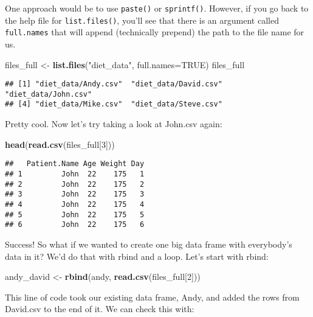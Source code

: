 \documentclass[
]{article}
\newenvironment{Shaded}{\begin{snugshade}}{\end{snugshade}}
\newcommand{\DataTypeTok}[1]{\textcolor[rgb]{0.13,0.29,0.53}{#1}}
\newcommand{\DecValTok}[1]{\textcolor[rgb]{0.00,0.00,0.81}{#1}}
\newcommand{\KeywordTok}[1]{\textcolor[rgb]{0.13,0.29,0.53}{\textbf{#1}}}
\newcommand{\NormalTok}[1]{#1}
\newcommand{\OtherTok}[1]{\textcolor[rgb]{0.56,0.35,0.01}{#1}}
\newcommand{\StringTok}[1]{\textcolor[rgb]{0.31,0.60,0.02}{#1}}
\begin{document}
One approach would be to use \texttt{paste()} or \texttt{sprintf()}.
However, if you go back to the help file for \texttt{list.files()},
you'll see that there is an argument called \texttt{full.names} that
will append (technically prepend) the path to the file name for us.

\begin{Shaded}
\begin{Highlighting}[]
\NormalTok{files_full <-}\StringTok{ }\KeywordTok{list.files}\NormalTok{(}\StringTok{"diet_data"}\NormalTok{, }\DataTypeTok{full.names=}\OtherTok{TRUE}\NormalTok{)}
\NormalTok{files_full}
\end{Highlighting}
\end{Shaded}

\begin{verbatim}
## [1] "diet_data/Andy.csv"  "diet_data/David.csv" "diet_data/John.csv" 
## [4] "diet_data/Mike.csv"  "diet_data/Steve.csv"
\end{verbatim}

Pretty cool. Now let's try taking a look at John.csv again:

\begin{Shaded}
\begin{Highlighting}[]
\KeywordTok{head}\NormalTok{(}\KeywordTok{read.csv}\NormalTok{(files_full[}\DecValTok{3}\NormalTok{]))}
\end{Highlighting}
\end{Shaded}

\begin{verbatim}
##   Patient.Name Age Weight Day
## 1         John  22    175   1
## 2         John  22    175   2
## 3         John  22    175   3
## 4         John  22    175   4
## 5         John  22    175   5
## 6         John  22    175   6
\end{verbatim}

Success! So what if we wanted to create one big data frame with
everybody's data in it? We'd do that with rbind and a loop. Let's start
with rbind:

\begin{Shaded}
\begin{Highlighting}[]
\NormalTok{andy_david <-}\StringTok{ }\KeywordTok{rbind}\NormalTok{(andy, }\KeywordTok{read.csv}\NormalTok{(files_full[}\DecValTok{2}\NormalTok{]))}
\end{Highlighting}
\end{Shaded}

This line of code took our existing data frame, Andy, and added the rows
from David.csv to the end of it. We can check this with:
\end{document}
